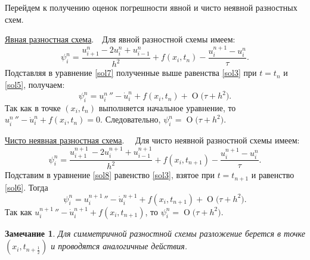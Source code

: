 \documentclass[11pt,a4paper,twoside,listtotoc,bibtotoc]{report}
\numberwithin{equation}{section}
\theoremstyle{definition}
\theoremstyle{plain}
\newtheorem*{note*}{Замечание}
\newcommand{\bigO}[1]{\ensuremath{\operatorname{O}\bigl(#1\bigr)}}
\begin{document}
\begin{solution}
    \noindent
    Перейдем к получению оценок погрешности явной и чисто неявной разностных схем.

    \underline{Явная разностная схема}.~~Для явной разностной схемы имеем:
    \begin{equation}
        \label{sol7}
        \psi^n_i = \frac{u^{n}_{i+1}-2u^n_i + u^n_{i-1}}{h^2} +
        f(x_i,t_n) - \frac{u^{n+1}_{i}-u^n_i}{\tau}.
    \end{equation}
    Подставляя в уравнение \eqref{sol7} полученные выше равенства \eqref{sol3}
    при $t = t_n$ и \eqref{sol5}, получаем:
    $$
        \psi^n_i = {u^{n~}_i}'' - \dot u^n_i + f(x_i,t_n) + \bigO{\tau + h^2}.
    $$
    Так как в точке $(x_i,t_n)$ выполняется начальное уравнение, то
    ${u^{n~}_i}'' - \dot u^n_i + f(x_i,t_n) = 0$.
    Следовательно, $\psi_i^n = \bigO{\tau + h^2}$.

    \underline{Чисто неявная разностная схема}. ~~Для чисто неявной разностной
    схемы имеем:
    \begin{equation}
        \label{sol8}
        \psi^n_i = \frac{u^{n+1~}_{i+1}-2u^{n+1}_i + u^{n+1}_{i-1}}{h^2} +
        f(x_i,t_{n+1}) - \frac{u^{n+1}_{i}-u^n_i}{\tau}.
    \end{equation}
    Подставим в уравнение \eqref{sol8} равенство \eqref{sol3}, взятое
    при $t = t_{n+1}$ и равенство \eqref{sol6}. Тогда
    $$
        \psi^n_i = {u^{n+1~}_i}'' - \dot u^{n+1}_i + f(x_i,t_{n+1}) + \bigO{\tau + h^2}.
    $$
    Так как ${u^{n+1~}_i}'' - \dot u^{n+1}_i + f(x_i,t_{n+1})$, то
    $\psi_i^n = \bigO{\tau + h^2}$.
    \begin{note*}
        Для симметричной разностной схемы разложение берется в точке
        $(x_i, t_{n+\frac12})$ и проводятся аналогичные действия.
    \end{note*}
%
\end{solution}
%
\end{document}
